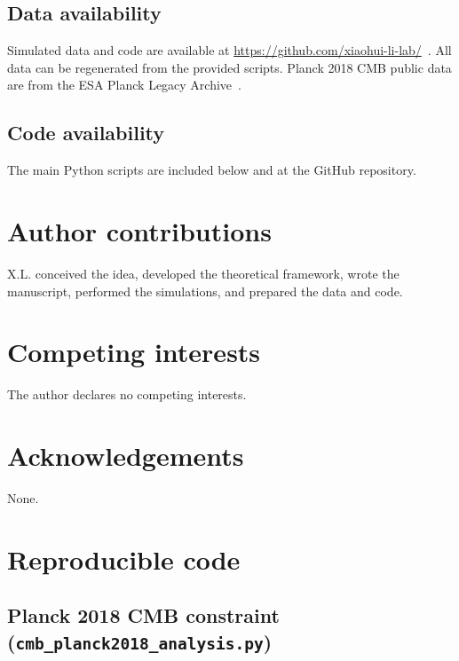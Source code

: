 \documentclass[11pt,a4paper]{article}
\theoremstyle{plain}
\begin{document}
\subsection{Data availability}
Simulated data and code are available at \url{https://github.com/xiaohui-li-lab/}~\cite{li2026}. All data can be regenerated from the provided scripts. Planck 2018 CMB public data are from the ESA Planck Legacy Archive~\cite{planck2018}.

\subsection{Code availability}
The main Python scripts are included below and at the GitHub repository.

\section*{Author contributions}
X.L. conceived the idea, developed the theoretical framework, wrote the manuscript, performed the simulations, and prepared the data and code.

\section*{Competing interests}
The author declares no competing interests.

\section*{Acknowledgements}
None.

\appendix
\section{Reproducible code}

\subsection{Planck 2018 CMB constraint (\texttt{cmb\_planck2018\_analysis.py})}
\end{document}
